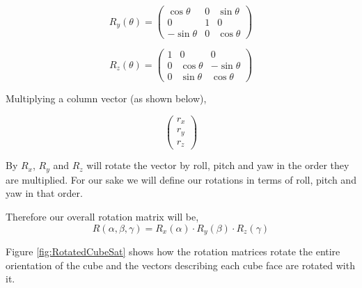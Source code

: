 \documentclass[10pt, letterpaper]{article}
\begin{document}
\[
  R_{y}(\theta)=
  \left( {\begin{array}{ccc}
   \cos{\theta} & 0 & \sin{\theta} \\
   0 & 1 & 0 \\
   -\sin{\theta} & 0 & \cos{\theta}
  \end{array} } \right)
\]

\[
  R_{z}(\theta)=
  \left( {\begin{array}{ccc}
   1 & 0 & 0 \\
   0 & \cos{\theta} & -\sin{\theta} \\
   0 & \sin{\theta} & \cos{\theta}
  \end{array} } \right)
\]

Multiplying a column vector (as shown below),

\[
  \left( {\begin{array}{c}
   r_{x}  \\
    r_{y} \\
   r_{z} 
  \end{array} } \right)
\]

By $R_{x}$, $R_{y}$ and $R_{z}$ will rotate the vector by roll, pitch and yaw in the order they are multiplied. For our sake we will define our rotations in terms of roll, pitch and yaw in that order.

Therefore our overall rotation matrix will be,
\begin{equation*}
R(\alpha, \beta, \gamma) = R_{x}(\alpha) \cdot R_{y}(\beta) \cdot R_{z}(\gamma)
\end{equation*}

Figure \ref{fig:RotatedCubeSat} shows how the rotation matrices rotate the entire orientation of the cube and the vectors describing each cube face are rotated with it.
\end{document}
